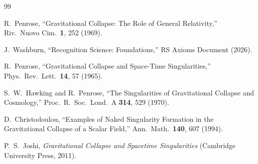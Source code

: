 \documentclass[12pt,a4paper]{article}
\theoremstyle{definition}
\theoremstyle{remark}
\begin{document}
\begin{thebibliography}{99}

R.~Penrose, ``Gravitational Collapse: The Role of General
Relativity,'' Riv.\ Nuovo Cim.\ \textbf{1}, 252 (1969).

J.~Washburn, ``Recognition Science: Foundations,''
RS Axioms Document (2026).

R.~Penrose, ``Gravitational Collapse and Space-Time Singularities,''
Phys.\ Rev.\ Lett.\ \textbf{14}, 57 (1965).

S.~W.~Hawking and R.~Penrose, ``The Singularities of Gravitational
Collapse and Cosmology,'' Proc.\ R.\ Soc.\ Lond.\ A \textbf{314},
529 (1970).

D.~Christodoulou, ``Examples of Naked Singularity Formation in the
Gravitational Collapse of a Scalar Field,'' Ann.\ Math.\
\textbf{140}, 607 (1994).

P.~S.~Joshi, \textit{Gravitational Collapse and Spacetime
Singularities} (Cambridge University Press, 2011).

\end{thebibliography}
\end{document}
